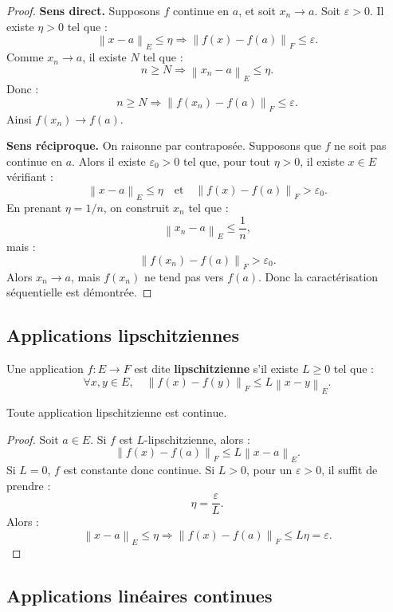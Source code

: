 \documentclass[11pt,a4paper]{article}
\newcommand{\norme}[1]{\left\lVert #1 \right\rVert}
\begin{document}
\begin{proof}
\textbf{Sens direct.}  
Supposons \(f\) continue en \(a\), et soit \(x_n\to a\).  
Soit \(\varepsilon>0\). Il existe \(\eta>0\) tel que :
\[
\norme{x-a}_E\leq \eta \Rightarrow \norme{f(x)-f(a)}_F\leq\varepsilon.
\]
Comme \(x_n\to a\), il existe \(N\) tel que :
\[
n\geq N\Rightarrow \norme{x_n-a}_E\leq \eta.
\]
Donc :
\[
n\geq N\Rightarrow \norme{f(x_n)-f(a)}_F\leq\varepsilon.
\]
Ainsi \(f(x_n)\to f(a)\).

\textbf{Sens réciproque.}  
On raisonne par contraposée. Supposons que \(f\) ne soit pas continue en \(a\).  
Alors il existe \(\varepsilon_0>0\) tel que, pour tout \(\eta>0\), il existe \(x\in E\) vérifiant :
\[
\norme{x-a}_E\leq \eta
\quad\text{et}\quad
\norme{f(x)-f(a)}_F>\varepsilon_0.
\]
En prenant \(\eta=1/n\), on construit \(x_n\) tel que :
\[
\norme{x_n-a}_E\leq \frac1n,
\]
mais :
\[
\norme{f(x_n)-f(a)}_F>\varepsilon_0.
\]
Alors \(x_n\to a\), mais \(f(x_n)\) ne tend pas vers \(f(a)\).  
Donc la caractérisation séquentielle est démontrée.
\end{proof}

\subsection{Applications lipschitziennes}

\begin{definitionbox}
Une application \(f:E\to F\) est dite \textbf{lipschitzienne} s'il existe \(L\geq0\) tel que :
\[
\forall x,y\in E,\quad \norme{f(x)-f(y)}_F\leq L\norme{x-y}_E.
\]
\end{definitionbox}

\begin{theorembox}
Toute application lipschitzienne est continue.
\end{theorembox}

\begin{proof}
Soit \(a\in E\).  
Si \(f\) est \(L\)-lipschitzienne, alors :
\[
\norme{f(x)-f(a)}_F\leq L\norme{x-a}_E.
\]
Si \(L=0\), \(f\) est constante donc continue.  
Si \(L>0\), pour un \(\varepsilon>0\), il suffit de prendre :
\[
\eta=\frac{\varepsilon}{L}.
\]
Alors :
\[
\norme{x-a}_E\leq \eta
\Rightarrow
\norme{f(x)-f(a)}_F\leq L\eta=\varepsilon.
\]
\end{proof}

\subsection{Applications linéaires continues}
\end{document}
